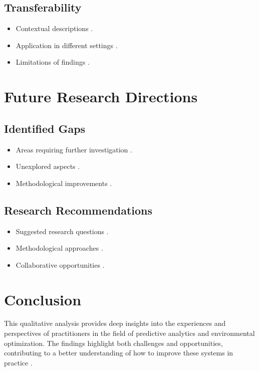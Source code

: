 \documentclass[a4paper]{report}
\begin{document}
\subsection{Transferability}  
\begin{itemize}  
    \item Contextual descriptions \cite{green2024}.  
    \item Application in different settings \cite{clark2023}.  
    \item Limitations of findings \cite{evans2024}.  
\end{itemize}  

\section{Future Research Directions}  
\subsection{Identified Gaps}  
\begin{itemize}  
    \item Areas requiring further investigation \cite{williams2024}.  
    \item Unexplored aspects \cite{singh2023}.  
    \item Methodological improvements \cite{rodriguez2024}.  
\end{itemize}  

\subsection{Research Recommendations}  
\begin{itemize}  
    \item Suggested research questions \cite{smith2023}.  
    \item Methodological approaches \cite{martin2024}.  
    \item Collaborative opportunities \cite{morris2023}.  
\end{itemize}  

\section{Conclusion}  
This qualitative analysis provides deep insights into the experiences and perspectives of practitioners in the field of predictive analytics and environmental optimization. The findings highlight both challenges and opportunities, contributing to a better understanding of how to improve these systems in practice \cite{brown2024}.
\end{document}
